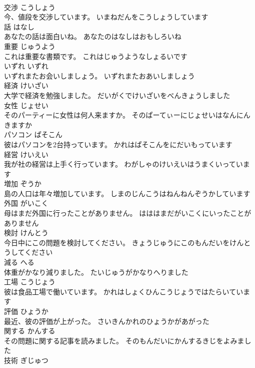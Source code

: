 \documentclass[8pt]{extreport}
\begin{document}
\begin{CJK}{UTF8}{min}
\\	交渉	こうしょう	
\\	今、値段を交渉しています。	いまねだんをこうしょうしています	
\\	話	はなし	
\\	あなたの話は面白いね。	あなたのはなしはおもしろいね	
\\	重要	じゅうよう	
\\	これは重要な書類です。	これはじゅうようなしょるいです	
\\	いずれ	いずれ	
\\	いずれまたお会いしましょう。	いずれまたおあいしましょう	
\\	経済	けいざい	
\\	大学で経済を勉強しました。	だいがくでけいざいをべんきょうしました	
\\	女性	じょせい	
\\	そのパーティーに女性は何人来ますか。	そのぱーてぃーにじょせいはなんにんきますか	
\\	パソコン	ぱそこん	
\\	彼はパソコンを2台持っています。	かれはぱそこんをにだいもっています	
\\	経営	けいえい	
\\	我が社の経営は上手く行っています。	わがしゃのけいえいはうまくいっています	
\\	増加	ぞうか	
\\	島の人口は年々増加しています。	しまのじんこうはねんねんぞうかしています	
\\	外国	がいこく	
\\	母はまだ外国に行ったことがありません。	はははまだがいこくにいったことがありません	
\\	検討	けんとう	
\\	今日中にこの問題を検討してください。	きょうじゅうにこのもんだいをけんとうしてください	
\\	減る	へる	
\\	体重がかなり減りました。	たいじゅうがかなりへりました	
\\	工場	こうじょう	
\\	彼は食品工場で働いています。	かれはしょくひんこうじょうではたらいています	
\\	評価	ひょうか	
\\	最近、彼の評価が上がった。	さいきんかれのひょうかがあがった	
\\	関する	かんする	
\\	その問題に関する記事を読みました。	そのもんだいにかんするきじをよみました	
\\	技術	ぎじゅつ	

\end{CJK}
\end{document}
